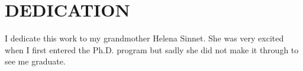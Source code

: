 %
%
%

\chapter*{DEDICATION}

I dedicate this work to my grandmother Helena Sinnet.
%
She was very excited when I first entered the Ph.D. program but sadly she did
not make it through to see me graduate.



\pagebreak{}
